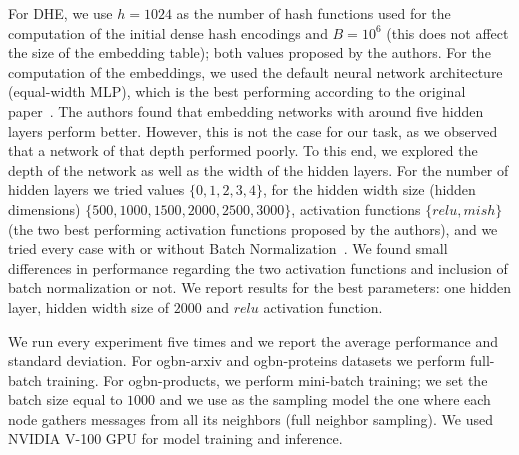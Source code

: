\documentclass[conference]{IEEEtran}
\begin{document}
For DHE, we use $h=1024$ as the number of hash functions used for the computation of the initial dense hash encodings and $B=10^6$ (this does not affect the size of the embedding table); both values proposed by the authors. For the computation of the embeddings, we used the default neural network architecture (equal-width MLP), which is the best performing according to the original paper~\cite{kang2020deep}.
The authors found that embedding networks with around five hidden layers perform better. However, this is not the case for our task, as we observed that a network of that depth performed poorly. To this end, we explored the depth of the network as well as the width of the hidden layers. 
% 
For the number of hidden layers we tried values $\{0,1,2,3,4\}$, for the hidden width size (hidden dimensions) $\{500, 1000, 1500, 2000, 2500,3000\}$, activation functions $\{relu, mish\}$ (the two best performing activation functions proposed by the authors), and we tried every case with or without Batch Normalization~\cite{ioffe2015batch}.
We found small differences in performance regarding the two activation functions and inclusion of batch normalization or not. We report results for the best parameters: one hidden layer, hidden width size of $2000$ and $relu$ activation function.

We run every experiment five times and we report the average performance and standard deviation. For ogbn-arxiv and ogbn-proteins datasets we perform full-batch training. For ogbn-products, we perform mini-batch training; we set the batch size equal to $1000$ and we use as the sampling model the one where each node gathers messages from all its neighbors (full neighbor sampling). We used NVIDIA V-100 GPU for model training and inference. 
\end{document}

